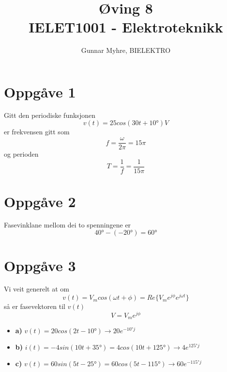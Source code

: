 \documentclass[12pt,a4paper]{article}
\title{%
  Øving 8 \\
  \large IELET1001 - Elektroteknikk \\
  }
\author{Gunnar Myhre, BIELEKTRO}
\begin{document}
  \maketitle

  \section*{Oppgåve 1}
    Gitt den periodiske funksjonen
    \begin{equation}
      v(t) = 25 cos(30t + \ang{10})V
    \end{equation}
    er frekvensen gitt som 
    \begin{equation}
      f = \frac{\omega}{2\pi} = 15\pi
    \end{equation}
    og perioden
    \begin{equation}
      T = \frac{1}{f} = \frac{1}{15\pi}
    \end{equation}


  \section*{Oppgåve 2}
    Fasevinklane mellom dei to spenningene er 
    \begin{equation}
      \ang{40} - (-\ang{20}) = \ang{60}
    \end{equation}

  \section*{Oppgåve 3}
    Vi veit generelt at om
    \begin{equation}
      v(t) = V_m cos(\omega t + \phi) = Re \{V_m e^{j\phi}e^{j\omega t} \}
    \end{equation}
    så er fasevektoren til $v(t)$
    \begin{equation}
      V=V_m e^{j\phi}
    \end{equation}
    \begin{itemize}
      \item \textbf{a)} $v(t) = 20 cos(2t-\ang{10}) \rightarrow 20e^{\ang{-10}j}$
      \item \textbf{b)} $i(t) = -4sin(10t+\ang{35}) = 4cos(10t+\ang{125}) \rightarrow
        4e^{\ang{125}j}$
      \item \textbf{c)} $v(t) = 60 sin(5t - \ang{25}) = 60cos(5t - \ang{115}) \rightarrow
        60e^{\ang{-115}j}$
    \end{itemize}
\end{document}
